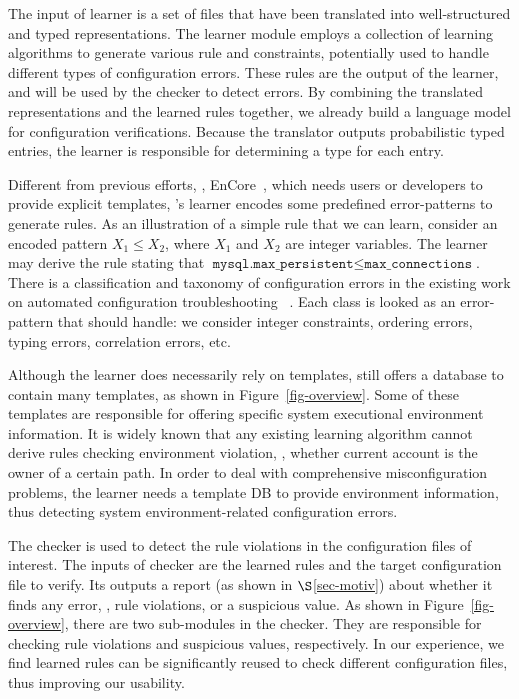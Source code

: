 The input of learner is a set of files that have been translated
into well-structured and typed representations.
The learner module employs a collection of learning algorithms
to generate various rule and constraints,
potentially used to handle different types of configuration errors.
These rules are the output of the learner, and will be 
used by the checker to detect errors.
By combining the translated representations and the learned
rules together, we already build a language model for
configuration verifications.
Because the translator outputs probabilistic typed entries,
the learner is responsible for determining a type for each entry.

Different from previous efforts, \eg, EnCore~\cite{zhang14encore},
which needs users or developers to provide explicit templates,
\app's learner encodes some predefined error-patterns 
to generate rules. 
As an illustration of a simple rule that we can learn,
consider an encoded pattern $X_1 \le X_2$, where $X_1$ and $X_2$ are
integer variables. The learner may derive the rule stating that
$\texttt{mysql.max\_persistent} \le \texttt{max\_connections}$. 
There is a classification and taxonomy of configuration errors in the 
existing work on automated configuration troubleshooting%
~\cite{yin11anempirical, configdataset}. 
Each class is looked as an error-pattern 
that \app should handle: we consider integer constraints, 
ordering errors, typing errors, correlation errors, etc.

Although the learner does necessarily rely on templates,
\app still offers a database to contain many templates,
as shown in Figure~\ref{fig-overview}.
Some of these templates are responsible for offering
specific system executional environment information.
It is widely known that any existing learning algorithm cannot
derive rules checking environment violation, \eg,
whether current account is the owner of a certain path.
In order to deal with comprehensive misconfiguration problems,
the learner needs a template DB to provide environment information,
thus detecting system environment-related configuration errors.

The checker is used to detect the rule violations in the configuration
files of interest. The inputs of checker are the learned rules 
and the target configuration file to verify.
Its outputs a report (as shown in $\S$\ref{sec-motiv}) about 
whether it finds any error, \eg, rule violations, or a suspicious value.
As shown in Figure~\ref{fig-overview},
there are two sub-modules in the checker. They are responsible for
checking rule violations and suspicious values, respectively.
In our experience, we find learned rules can be significantly reused
to check different configuration files, thus improving our usability.  
